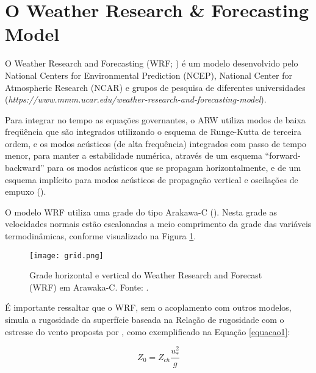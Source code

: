 
\section{O Weather Research \& Forecasting Model}
\bigskip

\noindent O Weather Research and Forecasting (WRF; \cite{Skamarock2008}) é um modelo desenvolvido pelo National Centers for Environmental Prediction (NCEP), National Center for Atmospheric Research (NCAR) e grupos de pesquisa de diferentes universidades (\textcolor{bleu_cite}{\textit{https://www.mmm.ucar.edu/weather-research-and-forecasting-model}}).
\bigskip

\noindent Para integrar no tempo as equações governantes, o ARW utiliza modos de baixa freqüência que são integrados utilizando o esquema de Runge-Kutta de terceira ordem, e os modos acústicos (de alta frequência) integrados com passo de tempo menor, para manter a estabilidade numérica, através de um esquema “forward-backward” para os modos acústicos que se propagam horizontalmente, e de um esquema implícito para modos acústicos de propagação vertical e oscilações de empuxo (\cite{Skamarock2008}).
\bigskip

\noindent O modelo WRF utiliza uma grade do tipo Arakawa-C (\cite{Arakawa1977}). Nesta grade as velocidades normais estão escalonadas a meio comprimento da grade das variáveis termodinâmicas, conforme visualizado na Figura \textcolor{bleu_cite}{\ref{gradeswrf}}.
\bigskip


\begin{figure}[H]
    \centering
    \captionsetup{justification=centering}
    \texttt{[image: grid.png]}
    \centering \caption{Grade horizontal e vertical do Weather Research and Forecast (WRF) em Arawaka-C. \newline Fonte: \textcite{Skamarock2008}.}
    \label{gradeswrf}
\end{figure}
\bigskip

\noindent É importante ressaltar que o WRF, sem o acoplamento com outros modelos, simula a rugosidade da superfície baseada na Relação de rugosidade com o estresse do vento proposta por \textcite{Charnock1955}, como exemplificado na Equação \textcolor{bleu_cite}{\ref{equacao1}}:
\bigskip

\begin{equation}
Z_{0} = Z_{ch} \frac{u_{*}^{2}}{g}
\label{equacao1}
\end{equation}

